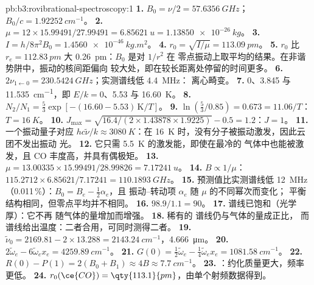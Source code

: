 \begin{solution}{pb:b3:rovibrational-spectroscopy:1}
\textbf{1.} $B_0 = \nu/2 = \qty{57.6356}{GHz}$；$B_0/c = \qty{1.92252}{cm^{-1}}$。
\textbf{2.} $\mu = 12 \times 15.99491/27.99491 = \qty{6.85621}{u} = \qty{1.13850e-26}{kg}$。
\textbf{3.} $I = h/8\pi^2B_0 = \qty{1.4560e-46}{kg.m^2}$。
\textbf{4.} $r_0 = \sqrt{I/\mu} = \qty{113.09}{pm}$。
\textbf{5.} $r_0$ 比 $r_e = \qty{112.83}{pm}$ 大 \qty{0.26}{pm}：$B_0$ 是对 $1/r^2$ 在
零点振动上取平均的结果。在非谐势阱中，振动的核间距偏向
较大处，即在较长距离处停留的时间更多。
\textbf{6.} $2\nu_{1\leftarrow0} = \qty{230.5424}{GHz}$；实测谱线低 \qty{4.4}{MHz}：
离心畸变。
\textbf{7.} $0$、3.845 与 \qty{11.535}{cm^{-1}}，即 $E/k = 0$、5.53 与 \qty{16.60}{K}。
\textbf{8.} $N_2/N_1 = \frac53\exp[-(16.60 - 5.53)\,\mathrm K/T]$。
\textbf{9.} $\ln(\frac53/0.85) = 0.673 = 11.06/T$：$T = \qty{16}{K}$。
\textbf{10.} $J_{\max} = \sqrt{16.4/(2 \times 1.43878 \times 1.9225)} - 0.5 = 1.2$：$J = 1$。
\textbf{11.} 一个振动量子对应 $hc\tilde\nu/k \approx \qty{3080}{K}$：在
\qty{16}{K} 时，没有分子被振动激发，因此云团不发出振动
光。
\textbf{12.} 它只需 \qty{5.5}{K} 的激发能，即使在最冷的
气体中也能被激发，且 CO 丰度高，并具有偶极矩。
\textbf{13.} $\mu = 13.00335 \times 15.99491/28.99826 = \qty{7.17241}{u}$。
\textbf{14.} $B \propto 1/\mu$：$115.2712 \times 6.85621/7.17241 = \qty{110.1893}{GHz}$。
\textbf{15.} 预测值比实测谱线低 \qty{12}{MHz}（0.011\,\%）：$B_0 = B_e - \frac12\alpha_e$，且
振动–转动项 $\alpha_e$ 随 $\mu$ 的不同幂次而变化；
平衡结构相同，但零点平均并不相同。
\textbf{16.} $98.9/1.1 = 90$。
\textbf{17.}  谱线已饱和（光学厚）：它不再
随气体的量增加而增强。
\textbf{18.} 稀有的  谱线仍与气体的量成正比，
而  谱线给出温度：二者合用，可同时测得二者。
\textbf{19.} $\tilde\nu_0 = 2169.81 - 2 \times 13.288 = \qty{2143.24}{cm^{-1}}$，\qty{4.666}{\micro m}。
\textbf{20.} $2\tilde\omega_e - 6\tilde\omega_ex_e = \qty{4259.89}{cm^{-1}}$。
\textbf{21.} $G(0) = \frac12\tilde\omega_e - \frac14\tilde\omega_ex_e = \qty{1081.58}{cm^{-1}}$。
\textbf{22.} $R(0) - P(1) = 2(B_0 + B_1) \approx 4B \approx \qty{7.7}{cm^{-1}}$。
\textbf{23.} ：约化质量更大，频率更低。
\textbf{24.} \textbf{$r_0(\ce{CO}) = \qty{113.1}{pm}$}，由单个射频数据得到。
\end{solution}
